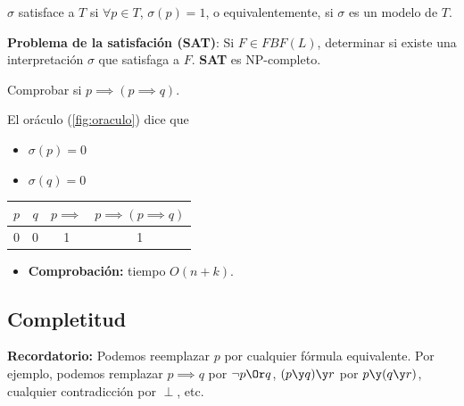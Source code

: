 \begin{defn}[Satisfación]
	$\sigma$ satisface a $T$ si $\forall p \in T$, $\sigma(p) = 1$, o equivalentemente, si $\sigma$ es un modelo de $T$.
\end{defn}

\begin{mdframed}
	\textbf{Problema de la satisfación (SAT)}: Si $F\in FBF(L)$, determinar si existe una interpretación $\sigma$ que satisfaga a $F$. \textbf{SAT} es {NP-completo}.
\end{mdframed}

\begin{example}
	Comprobar si $p\implies (p\implies q)$.

	El oráculo (\ref{fig:oraculo}) dice que
	\vspace{-3mm}
	\begin{itemize}
		\item $\sigma(p) = 0$
		\item $\sigma(q) = 0$
	\end{itemize}
	\begin{center}
		\begin{tabular}{|c|c|c|c|}
			\hline
			$p$ & $q$ & $p\implies$ & $p\implies(p\implies q)$\\
			\hline
			0 & 0 & 1 & 1\\
			\hline
		\end{tabular}
	\end{center}
	\begin{itemize}
		\item \textbf{Comprobación:} tiempo $O(n+k)$.
	\end{itemize}
\end{example}
\subsection{Completitud}
\textbf{Recordatorio:} Podemos reemplazar $p$ por cualquier fórmula equivalente. Por ejemplo, podemos remplazar $p\implies q$ por $\neg p \Or q$, $(p\y q)\y r$ por $p\y (q\y r)$, cualquier contradicción por $\perp$, etc.


